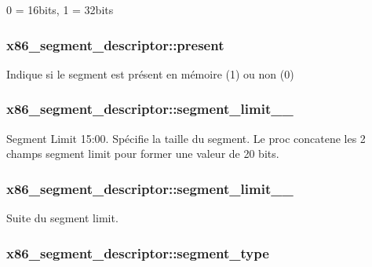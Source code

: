 0 = 16bits, 1 = 32bits \hypertarget{structx86__segment__descriptor_ad4196191d05e69b42272a411a69d1eae}{
\subsubsection[{present}]{ x86\-\_\-segment\-\_\-descriptor\-::present}}\label{structx86__segment__descriptor_ad4196191d05e69b42272a411a69d1eae}
Indique si le segment est présent en mémoire (1) ou non (0) \hypertarget{structx86__segment__descriptor_af9516f6d07c24ddedde31235b05b62c2}{
\subsubsection[{segment\-\_\-limit\-\_\-15\-\_\-0}]{ x86\-\_\-segment\-\_\-descriptor\-::segment\-\_\-limit\-\_\-\_}}\label{structx86__segment__descriptor_af9516f6d07c24ddedde31235b05b62c2}
Segment Limit 15\-:00. Spécifie la taille du segment. Le proc concatene les 2 champs segment limit pour former une valeur de 20 bits. \hypertarget{structx86__segment__descriptor_a6ab37b8f7730fe67af946725a3dd064a}{
\subsubsection[{segment\-\_\-limit\-\_\-19\-\_\-16}]{ x86\-\_\-segment\-\_\-descriptor\-::segment\-\_\-limit\-\_\-\_}}\label{structx86__segment__descriptor_a6ab37b8f7730fe67af946725a3dd064a}
Suite du segment limit. \hypertarget{structx86__segment__descriptor_ab3ef0c9fce1e74ee6549bbce5ea6f25f}{
\subsubsection[{segment\-\_\-type}]{ x86\-\_\-segment\-\_\-descriptor\-::segment\-\_\-type}}\label{structx86__segment__descriptor_ab3ef0c9fce1e74ee6549bbce5ea6f25f}
